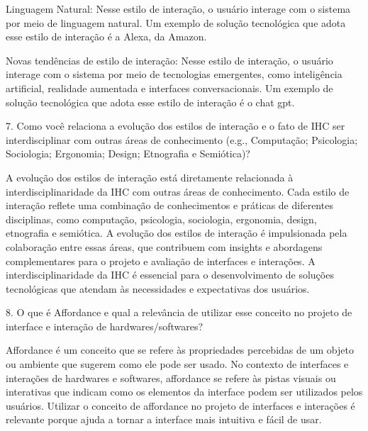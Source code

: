 \documentclass[12pt,a4paper]{article}
\begin{document}
Linguagem Natural: Nesse estilo de interação, o usuário interage com o sistema por meio de linguagem natural. Um exemplo de solução tecnológica que adota esse estilo de interação é a Alexa, da Amazon.

Novas tendências de estilo de interação: Nesse estilo de interação, o usuário interage com o sistema por meio de tecnologias emergentes, como inteligência artificial, realidade aumentada e interfaces conversacionais. Um exemplo de solução tecnológica que adota esse estilo de interação é o chat gpt.

\vspace{1cm}

7. Como você relaciona a evolução dos estilos de interação e o fato de IHC ser interdisciplinar com outras áreas de conhecimento (e.g., Computação; Psicologia; Sociologia; Ergonomia; Design; Etnografia e Semiótica)?

A evolução dos estilos de interação está diretamente relacionada à interdisciplinaridade da IHC com outras áreas de conhecimento. Cada estilo de interação reflete uma combinação de conhecimentos e práticas de diferentes disciplinas, como computação, psicologia, sociologia, ergonomia, design, etnografia e semiótica. A evolução dos estilos de interação é impulsionada pela colaboração entre essas áreas, que contribuem com insights e abordagens complementares para o projeto e avaliação de interfaces e interações. A interdisciplinaridade da IHC é essencial para o desenvolvimento de soluções tecnológicas que atendam às necessidades e expectativas dos usuários.

\vspace{1cm}

8. O que é Affordance e qual a relevância de utilizar esse conceito no projeto de interface e interação de hardwares/softwares?

Affordance é um conceito que se refere às propriedades percebidas de um objeto ou ambiente que sugerem como ele pode ser usado. No contexto de interfaces e interações de hardwares e softwares, affordance se refere às pistas visuais ou interativas que indicam como os elementos da interface podem ser utilizados pelos usuários. Utilizar o conceito de affordance no projeto de interfaces e interações é relevante porque ajuda a tornar a interface mais intuitiva e fácil de usar.
\end{document}
